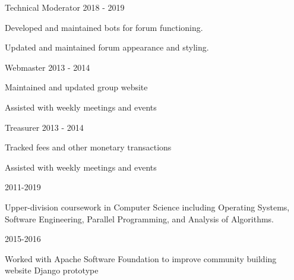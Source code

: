 \documentclass[11pt]{article} %
\begin{document}
\begin{description}
\squish
{}
            {Technical Moderator}
            {2018 - 2019}

Developed and maintained bots for forum functioning.

Updated and maintained forum appearance and styling.

           {Webmaster}
           {2013 - 2014}

Maintained and updated group website
    
Assisted with weekly meetings and events

           {Treasurer}
           {2013 - 2014}

Tracked fees and other monetary transactions

Assisted with weekly meetings and events


\end{description}


\begin{description}
\squish
{}
           {}
           {2011-2019}

Upper-division coursework in Computer Science including Operating Systems,\\
Software Engineering, Parallel Programming, and Analysis of Algorithms.


           {}
           {2015-2016}

Worked with Apache Software Foundation to improve community building website
Django prototype

\end{description}
\end{document}
